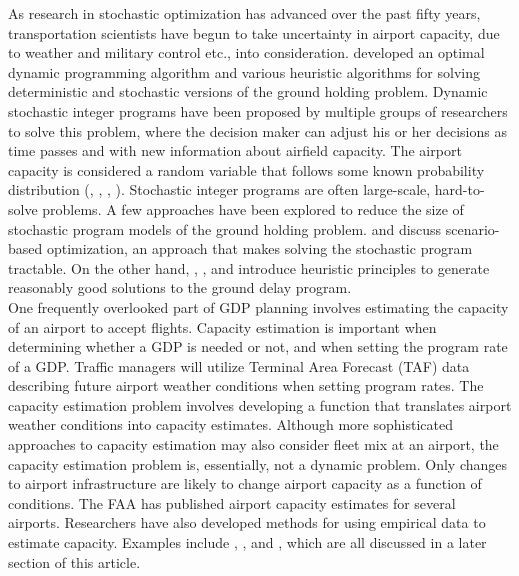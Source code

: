 \documentclass[12pt]{article}
\begin{document}
	\newline
	As research in stochastic optimization has advanced over the past fifty years, transportation scientists have begun to take uncertainty in airport capacity, due to weather and military control etc., into consideration. \cite{terrab} developed an optimal dynamic programming algorithm and various heuristic algorithms for solving deterministic and stochastic versions of the ground holding problem. Dynamic stochastic integer programs have been proposed by multiple groups of researchers to solve this problem, where the decision maker can adjust his or her decisions as time passes and with new information about airfield capacity. The airport capacity is considered a random variable that follows some known probability distribution (\cite{richetta1994dynamic}, \cite{mukherjee2005dynamic}, \cite{mukherjee2007dynamic}, \cite{mukherjee2012ground}). Stochastic integer programs are often large-scale, hard-to-solve problems. A few approaches have been explored to reduce the size of stochastic program models of the ground holding problem. \cite{liu2007scenario} and \cite{liu2008scenario} discuss scenario-based optimization, an approach that makes solving the stochastic program tractable. On the other hand, \cite{ball2001collaborative}, \cite{vossen2006optimization}, and \cite{ball2010ground} introduce heuristic principles to generate reasonably good solutions to the ground delay program.\\
	\newline
	One frequently overlooked part of GDP planning involves estimating the capacity of an airport to accept flights. Capacity estimation is important when determining whether a GDP is needed or not, and when setting the program rate of a GDP. Traffic managers will utilize Terminal Area Forecast (TAF) data describing future airport weather conditions when setting program rates.  The capacity estimation problem involves developing a function that translates airport weather conditions into capacity estimates.  Although more sophisticated approaches to capacity estimation may also consider fleet mix at an airport, the capacity estimation problem is, essentially, not a dynamic problem.  Only changes to airport infrastructure are likely to change airport capacity as a function of conditions.  The FAA has published airport capacity estimates for several airports.  Researchers have also developed methods for using empirical data to estimate capacity. Examples include \cite{kim}, \cite{gorripaty}, and \cite{ramnujam}, which are all discussed in a later section of this article.\\
\end{document}
